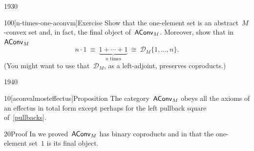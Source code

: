 \begin{parsec}{1930}
\begin{point}{100}[n-times-one-aconvm]{Exercise}
Show that the one-element set is an abstract~$M$-convex set
    and, in fact, the final object of~$\mathsf{AConv}_M$.
Moreover, show that in~$\mathsf{AConv}_M$
\begin{equation*}
    n \cdot 1 \ \equiv \ \underbrace{1 + \cdots + 1}_{\text{$n$ times}}
    \ \cong \ \mathcal{D}_M \{1, \ldots, n\}.
\end{equation*}
(You might want to use that~$\mathcal{D}_M$, as a left-adjoint,
    preserves coproducts.)
\end{point}
\end{parsec}

\begin{parsec}{1940}%
\begin{point}{10}[aconvalmosteffectus]{Proposition}%
The category~$\mathsf{AConv}_M$ obeys all the axioms of an effectus in total
form except perhaps for the left pullback square of~\eqref{pullbacks}.
\begin{point}{20}{Proof}%
In  we proved~$\mathsf{AConv}_M$ has binary coproducts
    and in 
    that the one-element set~$1$ is its final object.


\end{point}
\end{point}
\end{parsec}
